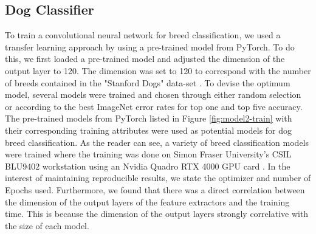 \documentclass{article}
\begin{document}
\subsection{Dog Classifier}

To train a convolutional neural network for breed classification, we used a transfer learning approach by using a pre-trained model from PyTorch.  To do this, we first loaded a pre-trained model and adjusted the dimension of the output layer to 120. The dimension was set to 120 to correspond with the number of breeds contained in the  "Stanford Dogs" data-set \cite{stanforddogs}.  To devise the optimum model, several models were trained and chosen through either random selection or according to the best ImageNet error rates for top one and top five accuracy.  The pre-trained models from PyTorch \cite{torchpretrained} listed in Figure \ref{fig:model2-train} with their corresponding training attributes were used as potential models for dog breed classification.  As the reader can see, a variety of breed classification models were trained where the training was done on Simon Fraser University's CSIL BLU9402 workstation using an Nvidia Quadro RTX 4000 GPU card \cite{BLU9402}.   In the interest of maintaining reproducible results, we state the optimizer and number of Epochs used.  Furthermore, we found that there was a direct correlation between the dimension of the output layers of the feature extractors and the training time.  This is because the dimension of the output layers strongly correlative with the size of each model.
\end{document}
